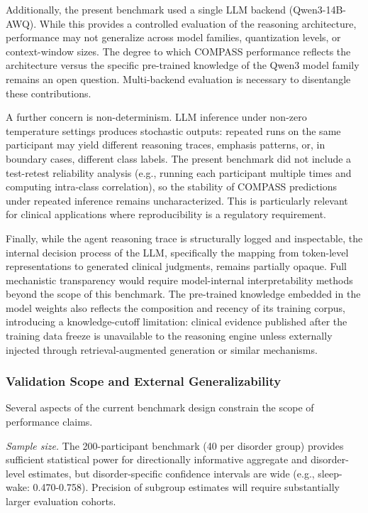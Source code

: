 \documentclass[11pt,a4paper,twoside]{article}
\begin{document}
Additionally, the present benchmark used a single LLM backend (Qwen3-14B-AWQ). While this provides a controlled evaluation of the reasoning architecture, performance may not generalize across model families, quantization levels, or context-window sizes. The degree to which COMPASS performance reflects the architecture versus the specific pre-trained knowledge of the Qwen3 model family remains an open question. Multi-backend evaluation is necessary to disentangle these contributions.

A further concern is non-determinism. LLM inference under non-zero temperature settings produces stochastic outputs: repeated runs on the same participant may yield different reasoning traces, emphasis patterns, or, in boundary cases, different class labels. The present benchmark did not include a test-retest reliability analysis (e.g., running each participant multiple times and computing intra-class correlation), so the stability of COMPASS predictions under repeated inference remains uncharacterized. This is particularly relevant for clinical applications where reproducibility is a regulatory requirement.

Finally, while the agent reasoning trace is structurally logged and inspectable, the internal decision process of the LLM, specifically the mapping from token-level representations to generated clinical judgments, remains partially opaque. Full mechanistic transparency would require model-internal interpretability methods beyond the scope of this benchmark. The pre-trained knowledge embedded in the model weights also reflects the composition and recency of its training corpus, introducing a knowledge-cutoff limitation: clinical evidence published after the training data freeze is unavailable to the reasoning engine unless externally injected through retrieval-augmented generation or similar mechanisms.

\subsubsection{Validation Scope and External Generalizability}

Several aspects of the current benchmark design constrain the scope of performance claims.

\textit{Sample size.} The 200-participant benchmark (40 per disorder group) provides sufficient statistical power for directionally informative aggregate and disorder-level estimates, but disorder-specific confidence intervals are wide (e.g., sleep-wake: 0.470-0.758). Precision of subgroup estimates will require substantially larger evaluation cohorts.
\end{document}
